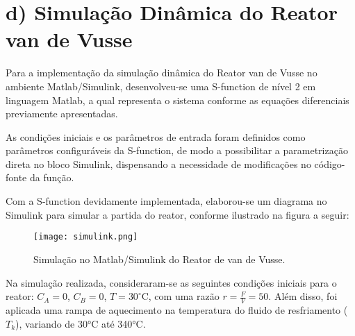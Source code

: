 \documentclass{article}
\begin{document}
\section*{d) Simulação Dinâmica do Reator van de Vusse}

Para a implementação da simulação dinâmica do Reator van de Vusse no ambiente Matlab/Simulink, desenvolveu-se uma S-function de nível 2 em linguagem Matlab, a qual representa o sistema conforme as equações diferenciais previamente apresentadas.

As condições iniciais e os parâmetros de entrada foram definidos como parâmetros configuráveis da S-function, de modo a possibilitar a parametrização direta no bloco Simulink, dispensando a necessidade de modificações no código-fonte da função.



Com a S-function devidamente implementada, elaborou-se um diagrama no Simulink para simular a partida do reator, conforme ilustrado na figura a seguir:

\begin{figure}[ht]
  \centering
  \texttt{[image: simulink.png]}
  \caption{Simulação no Matlab/Simulink do Reator de van de Vusse.}
\end{figure}

Na simulação realizada, consideraram-se as seguintes condições iniciais para o reator: $C_A = 0$, $C_B = 0$, $T = 30^\circ$C, com uma razão $r = \frac{F}{V} = 50$. Além disso, foi aplicada uma rampa de aquecimento na temperatura do fluido de resfriamento ($T_k$), variando de 30°C até 340°C.
\end{document}
